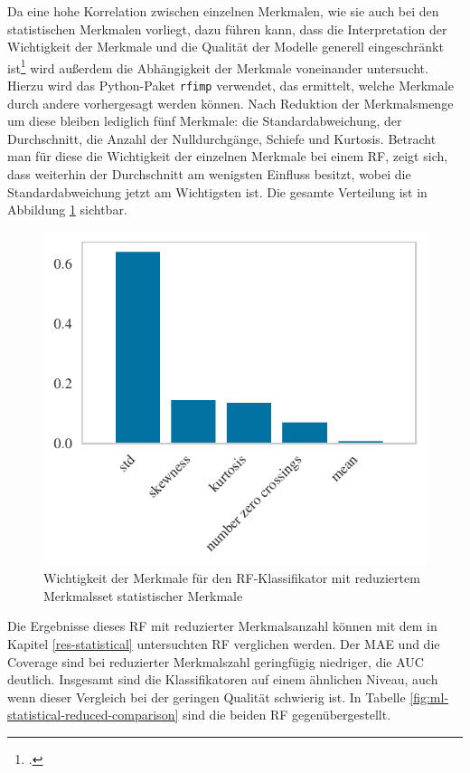 Da eine hohe Korrelation zwischen einzelnen Merkmalen, wie sie auch bei den statistischen Merkmalen vorliegt, dazu führen kann, dass die Interpretation der Wichtigkeit der Merkmale und die Qualität der Modelle generell eingeschränkt ist\footcite[Kapitel 8]{Harrison2019} wird außerdem die Abhängigkeit der Merkmale voneinander untersucht. Hierzu wird das Python-Paket \texttt{rfimp} verwendet, das ermittelt, welche Merkmale durch andere vorhergesagt werden können. Nach Reduktion der Merkmalsmenge um diese bleiben lediglich fünf Merkmale: die Standardabweichung, der Durchschnitt, die Anzahl der Nulldurchgänge, Schiefe und Kurtosis. Betracht man für diese die Wichtigkeit der einzelnen Merkmale bei einem \acl{RF}, zeigt sich, dass weiterhin der Durchschnitt am wenigsten Einfluss besitzt, wobei die Standardabweichung jetzt am Wichtigsten ist. Die gesamte Verteilung ist in Abbildung \ref{fig:rf-statistical-reduced} sichtbar.

\begin{figure}[H]
	\centering
	\includegraphics[scale=0.85]{pic/rf-reduced-statistical.pdf}
	\caption{Wichtigkeit der Merkmale für den \ac{RF}-Klassifikator mit reduziertem Merkmalsset statistischer Merkmale}
	\label{fig:rf-statistical-reduced}
\end{figure}

Die Ergebnisse dieses \acl{RF} mit reduzierter Merkmalsanzahl können mit dem in Kapitel \ref{res-statistical} untersuchten \acl{RF} verglichen werden. Der \ac{MAE} und die Coverage sind bei reduzierter Merkmalszahl geringfügig niedriger, die AUC deutlich. Insgesamt sind die Klassifikatoren auf einem ähnlichen Niveau, auch wenn dieser Vergleich bei der geringen Qualität schwierig ist. In Tabelle \ref{fig:ml-statistical-reduced-comparison} sind die beiden \acl{RF} gegenübergestellt.

